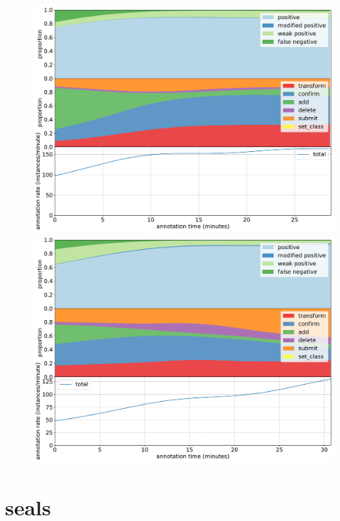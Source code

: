 \pagebreak
\begin{figure}[H]
\begin{minipage}[c][\textheight]{\textwidth}
\centering
\includegraphics[width=1.0\linewidth]{charts/aerial_penguins/action_annotations/hallett_a.pdf}
\includegraphics[width=1.0\linewidth]{charts/aerial_penguins/action_annotations/royds_a.pdf}
\caption{  }
\label{fig:royds_annotation}
\end{minipage}
\end{figure}


\pagebreak
\section {seals}

